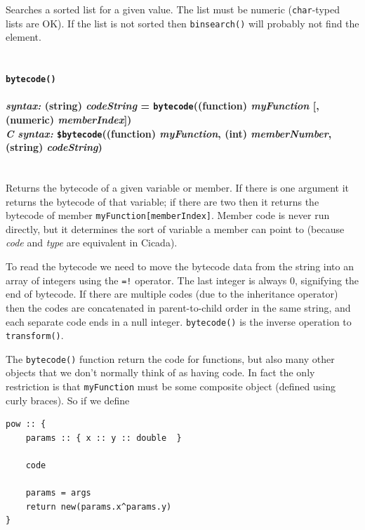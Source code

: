 \documentclass{article}
\newenvironment{code}{
       \begin{list}{}{
               \setlength{\leftmargin}{.4in}
               \setlength{\rightmargin}{0in}
               \setlength{\topsep}{.2in}
       }
       \small
       \item[] }
       { \end{list}   }
\begin{document}
Searches a sorted list for a given value.  The list must be numeric (\verb#char#-typed lists are OK).  If the list is not sorted then \verb#binsearch()# will probably not find the element.\\\\




\paragraph{\texttt{bytecode()}\\\\
\normalfont \emph{syntax: } (string) \emph{codeString} = \texttt{bytecode}((function) \emph{myFunction} [, (numeric) \emph{memberIndex}])\\
\normalfont \emph{C syntax: } \texttt{\$bytecode}((function) \emph{myFunction}, (int) \emph{memberNumber}, (string) \emph{codeString})\\\\}

Returns the bytecode of a given variable or member.  If there is one argument it returns the bytecode of that variable; if there are two then it returns the bytecode of member \verb#myFunction[memberIndex]#.  Member code is never run directly, but it determines the sort of variable a member can point to (because \emph{code} and \emph{type} are equivalent in Cicada).

To read the bytecode we need to move the bytecode data from the string into an array of integers using the \verb#=!# operator.  The last integer is always 0, signifying the end of bytecode.  If there are multiple codes (due to the inheritance operator) then the codes are concatenated in parent-to-child order in the same string, and each separate code ends in a null integer.  \texttt{bytecode()} is the inverse operation to \texttt{transform()}.

The \verb#bytecode()# function return the code for functions, but also many other objects that we don't normally think of as having code.  In fact the only restriction is that \verb#myFunction# must be some composite object (defined using curly braces).  So if we define

\begin{code} \begin{verbatim}
pow :: {
    params :: { x :: y :: double  }
    
    code
    
    params = args
    return new(params.x^params.y)
}
\end{verbatim} \end{code}
\end{document}
